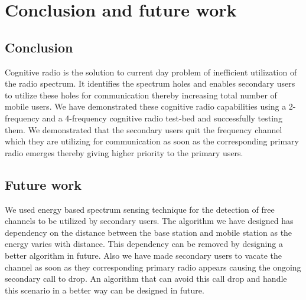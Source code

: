 \chapter{Conclusion and future work}

\section{Conclusion}
Cognitive radio is the solution to current day problem of inefficient 
utilization of the radio spectrum. It identifies the spectrum holes and 
enables secondary users to utilize these holes for communication thereby 
increasing total number of mobile users. We have demonstrated these cognitive
radio capabilities using a 2-frequency and a 4-frequency cognitive radio
test-bed and successfully testing them.  We demonstrated that the secondary 
users quit the frequency channel which they are utilizing for communication
as soon as the corresponding primary radio emerges thereby giving higher
priority to the primary users.


\section{Future work}
We used energy based spectrum sensing technique for the detection of free 
channels to be utilized by secondary users. The algorithm we have designed has
dependency on the distance between the base station and mobile station as the
energy varies with distance. This dependency can be removed by designing a 
better algorithm in future. Also we have made secondary users to vacate the
channel as soon as they corresponding primary radio appears causing the
ongoing secondary call to drop. An algorithm that can avoid this call drop and
handle this scenario in a better way can be designed in future.